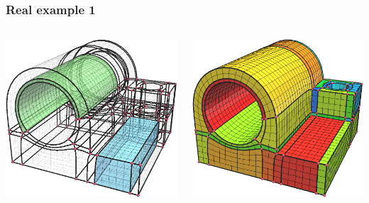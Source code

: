 \documentclass[12pt]{beamer}
\begin{document}
\begin{frame}[fragile]
  \frametitle{Real example 1}
  \begin{columns}
    \begin{column}{0.5\textwidth}
      \includegraphics[width=\textwidth]{./images/ex1-singularities.png}
    \end{column}
    \begin{column}{0.5\textwidth}
      \includegraphics[width=\textwidth]{./images/ex1-base-complex.png}
    \end{column}
  \end{columns}
\end{frame}
\end{document}
